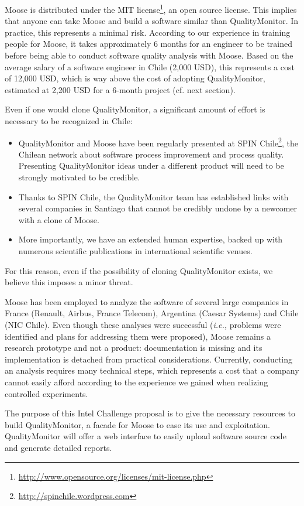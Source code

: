 \documentclass[runningheads]{llncs}
\newcommand{\ie}{\emph{i.e.,}\xspace}
\begin{document}
Moose is distributed under the MIT license\footnote{\url{http://www.opensource.org/licenses/mit-license.php}}, an open source license. This implies that anyone can take Moose and build a software similar than QualityMonitor. In practice, this represents a minimal risk. According to our experience in training people for Moose, it takes approximately 6 months for an engineer to be trained before being able to conduct software quality analysis with Moose. Based on the average salary of a software engineer in Chile (2,000 USD), this represents a cost of 12,000 USD, which is way above the cost of adopting QualityMonitor, estimated at 2,200 USD for a 6-month project (cf. next section). 

Even if one would clone QualityMonitor, a significant amount of effort is necessary to be recognized in Chile: 
\begin{itemize}
\item QualityMonitor and Moose have been regularly presented at SPIN Chile\footnote{\url{http://spinchile.wordpress.com}}, the Chilean network about software process improvement and process quality. Presenting QualityMonitor ideas under a different product will need to be strongly motivated to be credible.
\item Thanks to SPIN Chile, the QualityMonitor team has established links with several companies in Santiago that cannot be credibly undone by a newcomer with a clone of Moose. 
\item More importantly, we have an extended human expertise, backed up with numerous scientific publications in international scientific venues.
\end{itemize}

For this reason, even if the possibility of cloning QualityMonitor exists, we believe this imposes a minor threat.

Moose has been employed to analyze the software of several large companies in France (Renault, Airbus, France Telecom), Argentina (Caesar Systems) and Chile (NIC Chile). Even though these analyses were successful (\ie problems were identified and plans for addressing them were proposed), Moose remains a research prototype and not a product: documentation is missing and its implementation is detached from practical considerations. Currently, conducting an analysis requires many technical steps, which represents a cost that a company cannot easily afford according to the experience we gained when realizing controlled experiments.

The purpose of this Intel Challenge proposal is to give the necessary resources to build QualityMonitor, a facade for Moose to ease its use and exploitation. QualityMonitor will offer a  web interface to easily upload software source code and generate detailed reports. 
\end{document}
